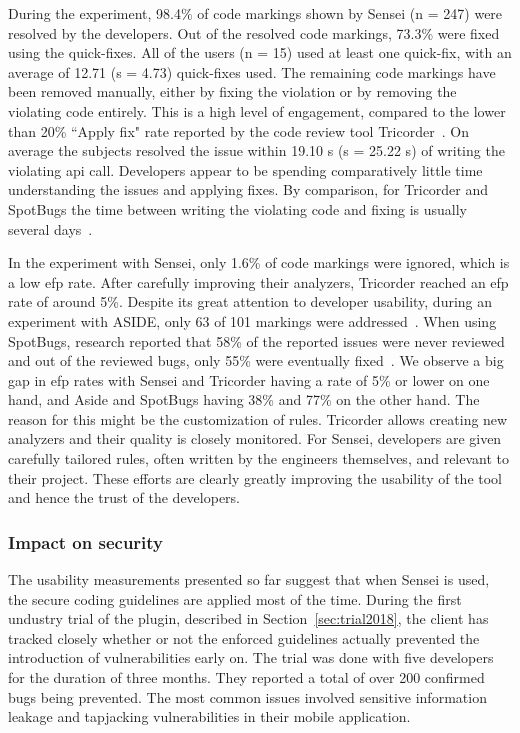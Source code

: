 During the experiment, 98.4\% of code markings shown by Sensei (n = 247) were resolved by the developers.
Out of the resolved code markings, 73.3\% were fixed using the quick-fixes.
All of the users (n = 15) used at least one quick-fix, with an average of 12.71 (s = 4.73) quick-fixes used.
The remaining code markings have been removed manually, either by fixing the violation or by removing the violating code entirely.
This is a high level of engagement, compared to the lower than 20\% ``Apply fix" rate reported by the code review tool Tricorder~\cite{sadowski2015tricorder}.
On average the subjects resolved the issue within 19.10 s (s = 25.22 s) of writing the violating \gls{api} call.
Developers appear to be spending comparatively little time understanding the issues and applying fixes.
By comparison, for Tricorder and SpotBugs the time between writing the violating code and fixing is usually several days~\cite{sadowski2015tricorder,ayewah2007using}.

In the experiment with Sensei, only 1.6\% of code markings were ignored, which is a low \gls{efp} rate.
After carefully improving their analyzers, Tricorder reached an \gls{efp} rate of around 5\%.
Despite its great attention to developer usability, during an experiment with ASIDE, only 63 of 101 markings were addressed~\cite{xie2011aside}.
When using SpotBugs, research reported that 58\% of the reported issues were never reviewed and out of the reviewed bugs, only 55\% were eventually fixed~\cite{ayewah2007using}.
We observe a big gap in \gls{efp} rates with Sensei and Tricorder having a rate of 5\% or lower on one hand, and Aside and SpotBugs having 38\% and 77\% on the other hand.
The reason for this might be the customization of rules.
Tricorder allows creating new analyzers and their quality is closely monitored.
For Sensei, developers are given carefully tailored rules, often written by the engineers themselves, and relevant to their project.
These efforts are clearly greatly improving the usability of the tool and hence the trust of the developers.

\subsubsection{Impact on security}
The usability measurements presented so far suggest that when Sensei is used, the secure coding guidelines are applied most of the time.
During the first undustry trial of the plugin, described in Section~\ref{sec:trial2018}, the client has tracked closely whether or not the enforced guidelines actually prevented the introduction of vulnerabilities early on.
The trial was done with five developers for the duration of three months.
They reported a total of over 200 confirmed bugs being prevented.
The most common issues involved sensitive information leakage and tapjacking vulnerabilities in their mobile application.

